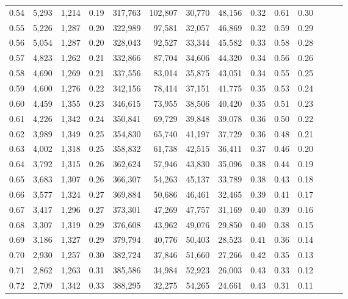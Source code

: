 \begin{tabular}{rrrrrrrrrrrrrr}
0.54 &  5,293 &  1,214 &  0.19 &  317,763 &  102,807 &  30,770 &  48,156 &  0.32 &  0.61 &      0.30 \\
0.55 &  5,226 &  1,287 &  0.20 &  322,989 &   97,581 &  32,057 &  46,869 &  0.32 &  0.59 &      0.29 \\
0.56 &  5,054 &  1,287 &  0.20 &  328,043 &   92,527 &  33,344 &  45,582 &  0.33 &  0.58 &      0.28 \\
0.57 &  4,823 &  1,262 &  0.21 &  332,866 &   87,704 &  34,606 &  44,320 &  0.34 &  0.56 &      0.26 \\
0.58 &  4,690 &  1,269 &  0.21 &  337,556 &   83,014 &  35,875 &  43,051 &  0.34 &  0.55 &      0.25 \\
0.59 &  4,600 &  1,276 &  0.22 &  342,156 &   78,414 &  37,151 &  41,775 &  0.35 &  0.53 &      0.24 \\
0.60 &  4,459 &  1,355 &  0.23 &  346,615 &   73,955 &  38,506 &  40,420 &  0.35 &  0.51 &      0.23 \\
0.61 &  4,226 &  1,342 &  0.24 &  350,841 &   69,729 &  39,848 &  39,078 &  0.36 &  0.50 &      0.22 \\
0.62 &  3,989 &  1,349 &  0.25 &  354,830 &   65,740 &  41,197 &  37,729 &  0.36 &  0.48 &      0.21 \\
0.63 &  4,002 &  1,318 &  0.25 &  358,832 &   61,738 &  42,515 &  36,411 &  0.37 &  0.46 &      0.20 \\
0.64 &  3,792 &  1,315 &  0.26 &  362,624 &   57,946 &  43,830 &  35,096 &  0.38 &  0.44 &      0.19 \\
0.65 &  3,683 &  1,307 &  0.26 &  366,307 &   54,263 &  45,137 &  33,789 &  0.38 &  0.43 &      0.18 \\
0.66 &  3,577 &  1,324 &  0.27 &  369,884 &   50,686 &  46,461 &  32,465 &  0.39 &  0.41 &      0.17 \\
0.67 &  3,417 &  1,296 &  0.27 &  373,301 &   47,269 &  47,757 &  31,169 &  0.40 &  0.39 &      0.16 \\
0.68 &  3,307 &  1,319 &  0.29 &  376,608 &   43,962 &  49,076 &  29,850 &  0.40 &  0.38 &      0.15 \\
0.69 &  3,186 &  1,327 &  0.29 &  379,794 &   40,776 &  50,403 &  28,523 &  0.41 &  0.36 &      0.14 \\
0.70 &  2,930 &  1,257 &  0.30 &  382,724 &   37,846 &  51,660 &  27,266 &  0.42 &  0.35 &      0.13 \\
0.71 &  2,862 &  1,263 &  0.31 &  385,586 &   34,984 &  52,923 &  26,003 &  0.43 &  0.33 &      0.12 \\
0.72 &  2,709 &  1,342 &  0.33 &  388,295 &   32,275 &  54,265 &  24,661 &  0.43 &  0.31 &      0.11 \\

\end{tabular}
